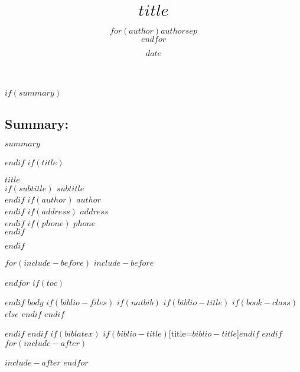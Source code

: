 \documentclass[fontsize=11pt]{scrartcl}
\title{$title$}
\author{$for(author)$$author$$sep$\\$endfor$}
\date{$date$}
\begin{document}
$if(summary)$
\begin{minipage}[t]{0.75\linewidth}
\begin{flushleft}
\subsection{Summary:}\label{summary}
$summary$
\end{flushleft}
\end{minipage}
$endif$
$if(title)$
\begin{flushright}
\begin{minipage}[t]{0.25\linewidth}
  {\LARGE\bfseries\sffamily
    $title$\\
    $if(subtitle)$
    \small\scshape
    $subtitle$\\
    $endif$
  }
  {\footnotesize\ttfamily
  $if(author)$
  $author$\\ 
  $endif$
  $if(address)$
    $address$\\ 
  $endif$
  $if(phone)$
  $phone$\\ 
  $endif$
  }
\end{minipage}
\end{flushright}
$endif$

$for(include-before)$
$include-before$

$endfor$
$if(toc)$
\tableofcontents

$endif$
$body$
$if(biblio-files)$
$if(natbib)$
$if(biblio-title)$
$if(book-class)$
\renewcommand\bibname{$biblio-title$}
$else$
\renewcommand\refname{$biblio-title$}
$endif$
$endif$

$endif$
$endif$
$if(biblatex)$
\printbibliography$if(biblio-title)$[title=$biblio-title$]$endif$
$endif$
$for(include-after)$

$include-after$
$endfor$
\end{document}
